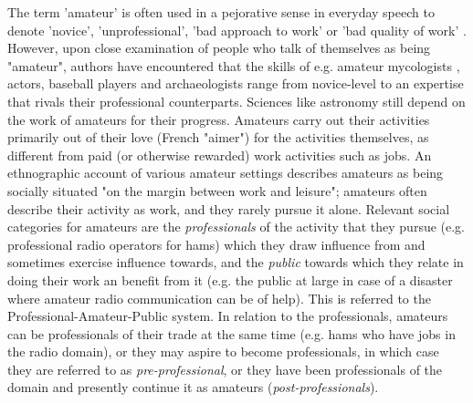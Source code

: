 \documentclass{sig-alt-release2}
\begin{document}
The term 'amateur' is often used in a pejorative sense in everyday speech to denote 'novice', 'unprofessional', 'bad approach to work' or 'bad quality of work' . However, upon close examination of people who talk of themselves as being "amateur", authors have encountered that the skills of e.g. amateur mycologists \cite{fine98}, actors, baseball players and archaeologists \cite{stebbins79} range from novice-level to an expertise that rivals their professional counterparts. Sciences like astronomy still depend on the work of amateurs for their progress. Amateurs carry out their activities primarily out of their love (French "aimer") for the activities themselves, as different from paid (or otherwise rewarded) work activities such as jobs. An ethnographic account of various amateur settings \cite{stebbins79} describes amateurs as being socially situated "on the margin between work and leisure"; amateurs often describe their activity as work, and they rarely pursue it alone. Relevant social categories for amateurs are the \textit{professionals} of the activity that they pursue (e.g. professional radio operators for hams) which they draw influence from and sometimes exercise influence towards, and the \textit{public} towards which they relate in doing their work an benefit from it (e.g. the public at large in case of a disaster where amateur radio communication can be of help). This is referred to the Professional-Amateur-Public system. In relation to the professionals, amateurs can be professionals of their trade at the same time (e.g. hams who have jobs in the radio domain), or they may aspire to become professionals, in which case they are referred to as \textit{pre-professional}, or they have been professionals of the domain and presently continue it as amateurs (\textit{post-professionals}).
\end{document}

